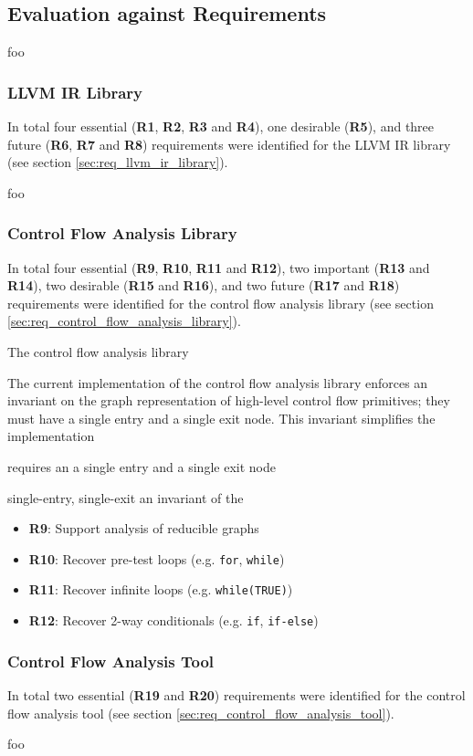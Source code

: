 
\subsection{Evaluation against Requirements}

foo

\subsubsection{LLVM IR Library}

In total four essential (\textbf{R1}, \textbf{R2}, \textbf{R3} and \textbf{R4}), one desirable (\textbf{R5}), and three future (\textbf{R6}, \textbf{R7} and \textbf{R8}) requirements were identified for the LLVM IR library (see section \ref{sec:req_llvm_ir_library}).

foo

\subsubsection{Control Flow Analysis Library}
\label{sec:eval_control_flow_analysis_library}

In total four essential (\textbf{R9}, \textbf{R10}, \textbf{R11} and \textbf{R12}), two important (\textbf{R13} and \textbf{R14}), two desirable (\textbf{R15} and \textbf{R16}), and two future (\textbf{R17} and \textbf{R18}) requirements were identified for the control flow analysis library (see section \ref{sec:req_control_flow_analysis_library}).

The control flow analysis library


The current implementation of the control flow analysis library enforces an invariant on the graph representation of high-level control flow primitives; they must have a single entry and a single exit node. This invariant simplifies the implementation

requires an a single entry and a single exit node

 single-entry, single-exit an invariant of the

\begin{itemize}
	\item \textbf{R9}: Support analysis of reducible graphs
	\item \textbf{R10}: Recover pre-test loops (e.g. \texttt{for}, \texttt{while})
	\item \textbf{R11}: Recover infinite loops (e.g. \texttt{while(TRUE)})
	\item \textbf{R12}: Recover 2-way conditionals (e.g. \texttt{if}, \texttt{if-else})
\end{itemize}

\subsubsection{Control Flow Analysis Tool}

In total two essential (\textbf{R19} and \textbf{R20}) requirements were identified for the control flow analysis tool (see section \ref{sec:req_control_flow_analysis_tool}).

foo
